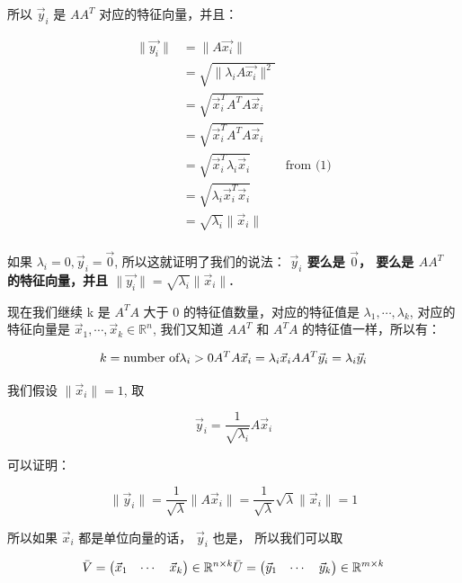 \documentclass[
]{book}
\begin{document}
所以 \(\vec{y}_i\) 是 \(AA^T\) 对应的特征向量，并且：

\[
\begin{aligned}
\parallel \vec{y_i}\parallel  {}
&= \parallel  A\vec{x_i}\parallel  \\
&= \sqrt{ \parallel  \lambda_i A\vec{x_i}\parallel  ^2}\\
&= \sqrt{ \vec{x}_i^T A^T A \vec{x}_i} \\
&= \sqrt{ \vec{x}_i^T A^T A \vec{x}_i} \\ 
&= \sqrt{ \vec{x}_i^T \lambda_i \vec{x}_i} & \text{from (1)} \\
&= \sqrt{  \lambda_i \vec{x}_i^T \vec{x}_i} \\
&= \sqrt{  \lambda_i} \parallel \vec{x}_i\parallel  \\
\end{aligned}
\]

如果 \(\lambda_i = 0, \vec{y}_i = \vec{0}\), 所以这就证明了我们的说法： \textbf{\(\vec{y}_i\) 要么是 \(\vec{0}\)， 要么是 \(AA^T\) 的特征向量，并且 \(\parallel \vec{y_i}\parallel = \sqrt{ \lambda_i} \parallel \vec{x}_i\parallel\).}

现在我们继续 k 是 \(A^TA\) 大于 0 的特征值数量，对应的特征值是 \(\lambda_1, \cdots, \lambda_k\), 对应的特征向量是 \(\vec{x}_1, \cdots, \vec{x}_k \in \mathbb{R}^n\), 我们又知道 \(AA^T\) 和 \(A^TA\) 的特征值一样，所以有：

\[
k = \text{number of} \lambda_i > 0 \\
A^TA \vec{x}_i = \lambda_i \vec{x}_i \\
AA^T \vec{y}_i = \lambda_i \vec{y}_i \\
\]

我们假设 \(\parallel \vec{x}_i\parallel = 1\), 取

\[\vec{y}_i = \frac{1}{\sqrt{\lambda_i}} A \vec{x}_i  \tag{3}\]

可以证明：

\[
\parallel \vec{y}_i\parallel  = \frac{1}{\sqrt{\lambda}} \parallel A\vec{x}_i \parallel  = \frac{1}{\sqrt{\lambda}} \sqrt{\lambda} \parallel \vec{x}_i\parallel  = 1
\]

所以如果 \(\vec{x}_i\) 都是单位向量的话， \(\vec{y}_i\) 也是， 所以我们可以取

\[
\bar{V} = \begin{pmatrix} \vec{x}_1 & \cdots & \vec{x}_k \end{pmatrix}  \in \mathbb{R}^{n \times k} \\
\bar{U} = \begin{pmatrix} \vec{y}_1 & \cdots & \vec{y}_k \end{pmatrix} \in \mathbb{R}^{m \times k}
\]
\end{document}
